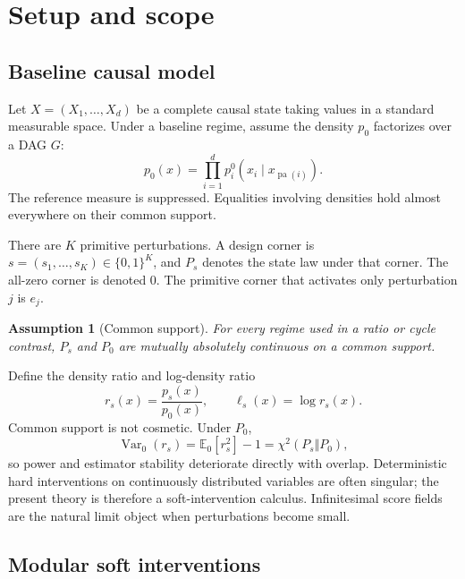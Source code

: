 \documentclass[11pt]{article}
\newtheorem{assumption}[theorem]{Assumption}
\newcommand{\E}{\mathbb{E}}
\newcommand{\Var}{\operatorname{Var}}
\newcommand{\pa}{\operatorname{pa}}
\begin{document}
\section{Setup and scope}

\subsection{Baseline causal model}

Let \(X=(X_1,\ldots,X_d)\) be a complete causal state taking values in a standard measurable space.  Under a baseline regime, assume the density \(p_0\) factorizes over a DAG \(G\):
\begin{equation}
p_0(x)=\prod_{i=1}^d p_i^0(x_i\mid x_{\pa(i)}).
\label{eq:baseline-factorization}
\end{equation}
The reference measure is suppressed.  Equalities involving densities hold almost everywhere on their common support.

There are \(K\) primitive perturbations.  A design corner is \(s=(s_1,\ldots,s_K)\in\{0,1\}^K\), and \(P_s\) denotes the state law under that corner.  The all-zero corner is denoted \(0\).  The primitive corner that activates only perturbation \(j\) is \(e_j\).

\begin{assumption}[Common support]
For every regime used in a ratio or cycle contrast, \(P_s\) and \(P_0\) are mutually absolutely continuous on a common support.
\end{assumption}

Define the density ratio and log-density ratio
\begin{equation}
r_s(x)=\frac{p_s(x)}{p_0(x)},
\qquad
\ell_s(x)=\log r_s(x).
\end{equation}
Common support is not cosmetic.  Under \(P_0\),
\begin{equation}
\Var_0(r_s)=\E_0[r_s^2]-1=\chi^2(P_s\Vert P_0),
\end{equation}
so power and estimator stability deteriorate directly with overlap.  Deterministic hard interventions on continuously distributed variables are often singular; the present theory is therefore a soft-intervention calculus.  Infinitesimal score fields are the natural limit object when perturbations become small.

\subsection{Modular soft interventions}
\end{document}
